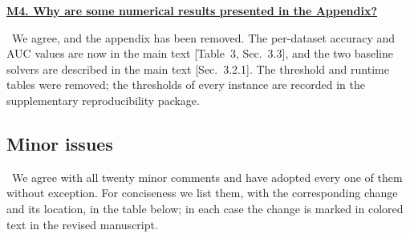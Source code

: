 \documentclass[11pt]{article}
\newcommand{\response}[1]{\smallskip\noindent{\color{blue!60!black}\textbf{Response.}}\ #1\par\medskip}
\newcommand{\loc}[1]{\textcolor{blue!50!black}{[#1]}}
\newenvironment{point}[1]{\medskip\noindent\textbf{\uline{#1}}\par}{\par}
\begin{document}
\begin{point}{M4. Why are some numerical results presented in the Appendix?}
\response{We agree, and the appendix has been removed. The per-dataset accuracy and AUC values are now in the main text \loc{Table~3, Sec.~3.3}, and the two baseline solvers are described in the main text \loc{Sec.~3.2.1}. The threshold and runtime tables were removed; the thresholds of every instance are recorded in the supplementary reproducibility package.}
\end{point}

\subsection*{Minor issues}

\ We agree with all twenty minor comments and have adopted every one of them without exception. For conciseness we list them, with the corresponding change and its location, in the table below; in each case the change is marked in colored text in the revised manuscript.
\end{document}
